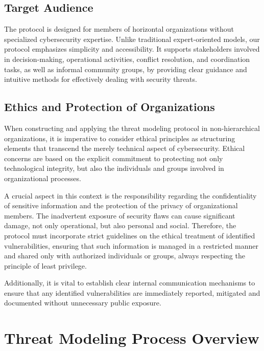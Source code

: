 \subsection{Target Audience}
\label{subsec:target_audience}

The protocol is designed for members of horizontal organizations without
specialized cybersecurity expertise. Unlike traditional expert-oriented models,
our protocol emphasizes simplicity and accessibility. It supports stakeholders
involved in decision-making, operational activities, conflict resolution, and
coordination tasks, as well as informal community groups, by providing clear
guidance and intuitive methods for effectively dealing with security threats.


\subsection{Ethics and Protection of Organizations}
\label{subsec:ethics_protection}

When constructing and applying the threat modeling protocol in non-hierarchical
organizations, it is imperative to consider ethical principles as structuring
elements that transcend the merely technical aspect of cybersecurity. Ethical
concerns are based on the explicit commitment to protecting not only
technological integrity, but also the individuals and groups involved in
organizational processes.

A crucial aspect in this context is the responsibility regarding the
confidentiality of sensitive information and the protection of the privacy of
organizational members. The inadvertent exposure of security flaws can cause
significant damage, not only operational, but also personal and social.
Therefore, the protocol must incorporate strict guidelines on the ethical
treatment of identified vulnerabilities, ensuring that such information is
managed in a restricted manner and shared only with authorized individuals or
groups, always respecting the principle of least privilege.

Additionally, it is vital to establish clear internal communication mechanisms
to ensure that any identified vulnerabilities are immediately reported,
mitigated and documented without unnecessary public exposure.

\section{Threat Modeling Process Overview}
\label{sec:threat_modeling_process_overview}

